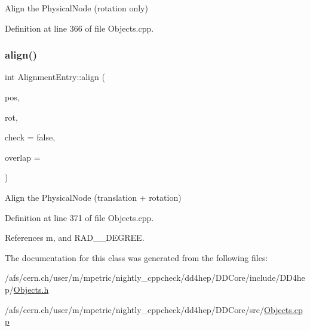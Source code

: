 Align the Physical\+Node (rotation only) 



Definition at line 366 of file Objects.\+cpp.

\hypertarget{class_d_d4hep_1_1_geometry_1_1_alignment_entry_ad66e1d47dd542160eea927f23b76018a}{}\label{class_d_d4hep_1_1_geometry_1_1_alignment_entry_ad66e1d47dd542160eea927f23b76018a} 
\subsubsection{\texorpdfstring{align()}{align()}\hspace{0.1cm}{\footnotesize\ttfamily [3/3]}}
{\footnotesize\ttfamily int Alignment\+Entry\+::align (\begin{DoxyParamCaption}\item[{const \hyperlink{namespace_d_d4hep_1_1_geometry_a55083902099d03506c6db01b80404900}{Position} \&}]{pos,  }\item[{const \hyperlink{namespace_d_d4hep_1_1_geometry_a24667b2b9c3cec3d5239828db4d52189}{Rotation\+Z\+YX} \&}]{rot,  }\item[{bool}]{check = {\ttfamily false},  }\item[{double}]{overlap = {} }\end{DoxyParamCaption})}



Align the Physical\+Node (translation + rotation) 



Definition at line 371 of file Objects.\+cpp.



References m, and R\+A\+D\+\_\+\_\+\+D\+E\+G\+R\+EE.



The documentation for this class was generated from the following files\+:\begin{DoxyCompactItemize}
\item 
/afs/cern.\+ch/user/m/mpetric/nightly\+\_\+cppcheck/dd4hep/\+D\+D\+Core/include/\+D\+D4hep/\hyperlink{_objects_8h}{Objects.\+h}\item 
/afs/cern.\+ch/user/m/mpetric/nightly\+\_\+cppcheck/dd4hep/\+D\+D\+Core/src/\hyperlink{_objects_8cpp}{Objects.\+cpp}\end{DoxyCompactItemize}
